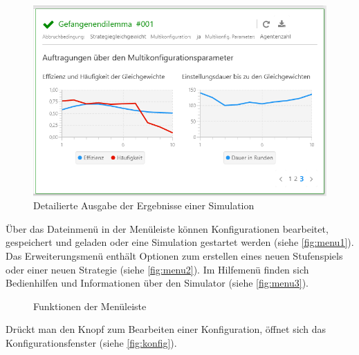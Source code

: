 \documentclass[parskip=full,11pt]{scrartcl}
\begin{document}
\begin{figure}[H]
	\centering
	\includegraphics[width=\textwidth]{images/home_out_3.png}
	\caption{\label{fig:home_out_3}
		Detailierte Ausgabe der Ergebnisse einer Simulation}
\end{figure}

Über das Dateinmenü in der Menüleiste können Konfigurationen bearbeitet, gespeichert und geladen oder eine Simulation gestartet werden (siehe \cref{fig:menu1}).
Das Erweiterungsmenü enthält Optionen zum erstellen eines neuen Stufenspiels oder einer neuen \Gls{Strategie} (siehe \cref{fig:menu2}). Im Hilfemenü finden sich Bedienhilfen und Informationen über den Simulator (siehe \cref{fig:menu3}).

\begin{figure}[ht]
	\centering
	\qquad
	\qquad
	\caption{\label{fig:menu}
		Funktionen der Menüleiste
	}
\end{figure}
\newpage
Drückt man den Knopf zum Bearbeiten einer Konfiguration, öffnet sich das Konfigurationsfenster (siehe \cref{fig:konfig}).
\end{document}
